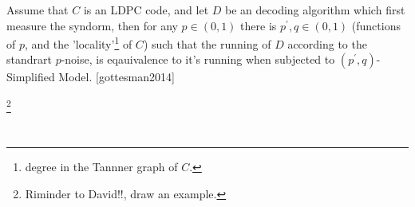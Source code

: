 \documentclass{beamer}
\begin{document}
\begin{frame}
  \begin{claim}
    Assume that $C$ is an LDPC code, and let $D$ be an decoding algorithm which first measure the syndorm, then for any $p \in (0,1)$ there is $p^{\prime}, q \in (0,1)$ (functions of $p$, and the 'locality'\footnote{degree in the Tannner graph of $C$.} of $C$) such that the running of $D$ according to the standrart $p$-noise, is eqauivalence to it's running when subjected to $(p^{\prime}, q)$-Simplified Model. [gottesman2014]
  \end{claim}
  \footnote{Riminder to David!!, draw an example.}
  
\end{frame}

\begin{frame}
  \begin{figure}[h]
    \begin{subfigure}[h]{0.4\textwidth}

    \label{alg:three}
    \end{subfigure}
    \begin{subfigure}[h]{0.1\textwidth}
      \
    \end{subfigure}
    \begin{subfigure}[h]{0.45\textwidth} 

    \label{fig:location}
    \end{subfigure} 
  \end{figure}

\end{frame}
\end{document}
